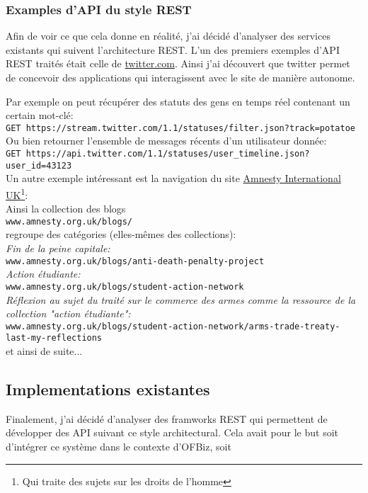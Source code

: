 \subsubsection{Examples d'API du style REST}
Afin de voir ce que cela donne en réalité, j'ai décidé d'analyser des services existants qui suivent l'architecture REST. 
L'un des premiers exemples d'API REST traités était celle de \href{https://twitter.com/}{twitter.com}. Ainsi j'ai découvert que twitter permet de concevoir des applications qui interagissent avec le site de manière autonome. 

Par exemple on peut récupérer des statuts des gens en temps réel contenant un certain mot-clé: \\
\verb|GET https://stream.twitter.com/1.1/statuses/filter.json?track=potatoe|\\

Ou bien retourner l'ensemble de messages récents d'un utilisateur donnée:\\
\verb|GET https://api.twitter.com/1.1/statuses/user_timeline.json?user_id=43123|
\\

Un autre exemple intéressant est la navigation du site  \href{https://www.amnesty.org.uk/}{Amnesty International UK}\footnote{ Qui traite des sujets sur les droits de l'homme}:
\\
Ainsi la collection des blogs \\
\verb|www.amnesty.org.uk/blogs/|\\
regroupe des catégories (elles-mêmes des collections): \\
 \emph{Fin de la peine capitale:} \\
 \verb|www.amnesty.org.uk/blogs/anti-death-penalty-project|\\
 \emph{Action étudiante:}\\
 \verb|www.amnesty.org.uk/blogs/student-action-network|\\
 \emph{Réflexion au sujet du traité sur le commerce des armes comme la ressource de la collection "action étudiante":} \\
 \verb|www.amnesty.org.uk/blogs/student-action-network/arms-trade-treaty-last-my-reflections| \\
 et ainsi de suite...
 

\subsection{Implementations existantes}
Finalement, j'ai décidé d'analyser des framworks REST qui permettent de développer des API suivant ce style architectural. Cela avait pour le but soit d'intégrer ce système dans le contexte d'OFBiz, soit 
